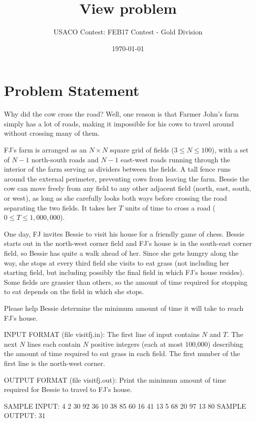 \documentclass[12pt]{article}
\title{View problem}
\author{USACO Contest: FEB17 Contest - Gold Division}
\date{\today}
\begin{document}
\maketitle

\section*{Problem Statement}

Why did the cow cross the road?  Well, one reason is that Farmer John's farm
simply has a lot of roads, making it impossible for his cows to travel around
without crossing many of them.

FJ's farm is arranged as an $N \times N$ square grid of fields
($3 \leq N \leq 100$), with a set of $N-1$ north-south roads and $N-1$ east-west
roads running through the interior of the farm serving as dividers between the
fields.  A tall fence runs around the external perimeter, preventing cows from
leaving the farm.  Bessie the cow can move freely from any field to any other
adjacent field (north, east, south, or west), as long as she carefully looks
both ways before crossing the road separating the two fields.  It takes her $T$
units of time to cross a road ($0 \leq T \leq 1,000,000$).

One day, FJ invites Bessie to visit his house for a friendly game of chess. 
Bessie starts out in the north-west corner field and FJ's house is in the
south-east corner field, so Bessie has quite a walk ahead of her. Since she gets
hungry along the way, she stops at every third field she visits to eat grass
(not including her starting field, but including possibly the final field in
which FJ's house resides).  Some fields are grassier than others, so the amount
of time required for stopping to eat depends on the field in which she stops.  

Please help Bessie determine the minimum amount of time it will take to reach
FJ's house.

INPUT FORMAT (file visitfj.in):
The first line of input contains $N$ and $T$.  The next $N$ lines each contain
$N$ positive integers (each at most 100,000) describing the amount of time
required to eat grass in each field.  The first number of the first line is the 
north-west corner.

OUTPUT FORMAT (file visitfj.out):
Print the minimum amount of time required for Bessie to travel to FJ's house.

SAMPLE INPUT:
4 2
30 92 36 10
38 85 60 16
41 13 5 68
20 97 13 80
SAMPLE OUTPUT: 
31
\end{document}
